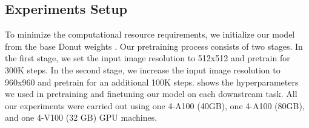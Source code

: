 \subsection{Experiments Setup}
\label{app:details-downstream-tasks}
To minimize the computational resource requirements, we initialize our model from the base Donut weights \cite{kim2022ocr}. Our pretraining process consists of two stages. In the first stage, we set the input image resolution to 512x512 and pretrain for 300K steps. In the second stage, we increase the input image resolution to 960x960 and pretrain for an additional 100K steps.  shows the hyperparameters we used in pretraining and finetuning our model on each downstream task. All our experiments were carried out using one 4-A100 (40GB), one 4-A100 (80GB), and one 4-V100 (32 GB) GPU machines.  

\begin{table}[t]
 \setlength\extrarowheight{2pt}
 \centering
 \caption{
  Training details for pretraining and finetuning experiments.
 }
 \label{tab:finetuning-details}
\end{table}


